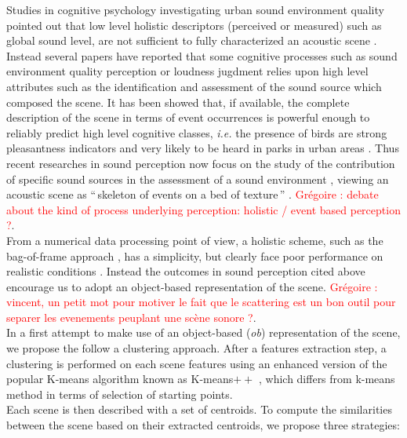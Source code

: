 \documentclass[journal]{IEEEtran}
\newcommand{\gl}[1]{\textcolor{red}{Gr\'egoire : #1}}
\begin{document}
Studies in cognitive psychology investigating urban sound environment quality pointed out that low level holistic descriptors (perceived or measured) such as global sound level, are not sufficient to fully characterized an acoustic scene \cite{guyot2005urban,kang2006urban}. Instead several papers have reported that some cognitive processes such as sound environment quality perception \cite{dubois2006cognitive} or loudness jugdment \cite{kuwano_memory_2003}  relies upon high level attributes such as the identification and assessment of the sound source which composed the scene. It has been showed that, if available, the complete description of the scene in terms of event occurrences is powerful enough to reliably predict high level cognitive classes, \textit{i.e.} the presence of birds are strong pleasantness indicators and very likely to be heard in parks in urban areas \cite{lafayPartI}. Thus recent researches in sound perception now focus on the study of the contribution of specific sound sources in the assessment of a sound environment \cite{ricciardi2015sound,lavandier2006contribution}, viewing an acoustic scene as ``\,skeleton of events on a bed of texture\,''  \cite{nelken_ear_2013}. \gl{debate about the kind of process underlying perception: holistic / event based perception ?}. \\


From a numerical data processing point of view, a holistic scheme, such as the bag-of-frame approach \cite{aucouturier2007bag}, has a simplicity, but clearly face poor performance on realistic conditions \cite{lagrange:hal-01082501}. Instead the outcomes in sound perception cited above encourage us to adopt an object-based  representation of the scene. \gl{vincent, un petit mot pour motiver le fait que le scattering est un bon outil pour separer les evenements peuplant une scène sonore ?}. \\

In a first attempt to make use of an object-based (\emph{ob}) representation of the scene, we propose the follow a clustering approach. After a features extraction step,  a clustering is performed on each scene features using an enhanced version of the popular K-means algorithm known as K-means$++$ \cite{arthur2007k}, which differs from k-means method in terms of selection of starting points. \\

Each scene is then described with a set of centroids. To compute the similarities between the scene based on their extracted centroids, we propose three strategies:
\end{document}
